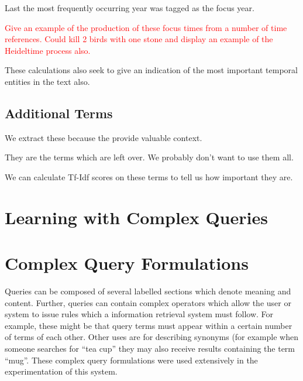 \documentclass{mpaper}
\newcommand{\remove}[1]{\textcolor{red}{#1}}
\begin{document}
Last the most frequently occurring year was tagged as the focus year.

\remove{Give an example of the production of these focus times from a number of time references. Could kill 2 birds with one stone and display an example of the Heideltime process also.}

These calculations also seek to give an indication of the most important temporal entities in the text also.
 
\subsection{Additional Terms}
We extract these because the provide valuable context.

They are the terms which are left over.
We probably don't want to use them all.

We can calculate Tf-Idf scores on these terms to tell us how important they are.

\section{Learning with Complex Queries}



\section{Complex Query Formulations} \label{sec:l2r}
Queries can be composed of several labelled sections which denote meaning and content. 
Further, queries can contain complex operators which allow the user or system to issue rules which a information retrieval system must follow. For example, these might be that query terms must appear within a certain number of terms of each other.
Other uses are for describing synonyms (for example when someone searches for ``tea cup'' they may also receive results containing the term ``mug''.
These complex query formulations were used extensively in the experimentation of this system.
\end{document}
